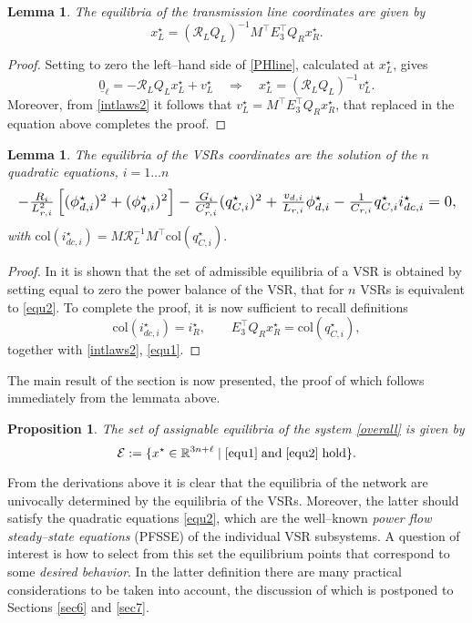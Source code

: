 \documentclass[5p,twocolumn]{elsarticle}
\def\begequ{\begin{equation}}
\def\endequ{\end{equation}}
\def\lab{\label}
\newtheorem{lemma}[theorem]{Lemma}
\newtheorem{proposition}[theorem]{Proposition}
\numberwithin{equation}{section}
\begin{document}
\begin{lemma}\em
\lab{lem1}
The equilibria of the transmission line coordinates are given by
\begequ
\lab{equ1}
x^\star _L=(\mathcal{R}_LQ_L)^{-1}M^\top E_3^\top Q_Rx_R^\star.
\endequ
\end{lemma}
\begin{proof}
Setting to zero the left--hand side of \eqref{PHline}, calculated at $x_L^\star $, gives
$$
\underline{0}_\ell=-\mathcal{R}_LQ_Lx^\star _L+v_L^\star \quad\Rightarrow\quad x^\star _L=(\mathcal{R}_LQ_L)^{-1}v_L^\star .
$$
Moreover, from \eqref{intlaws2} it follows that $v_L^\star =M^\top E_3^\top Q_Rx_R^\star $, that replaced in the equation above completes the proof.
\end{proof}

\begin{lemma}\em
\lab{lem2}
The equilibria of the VSRs coordinates are the solution of the $n$ quadratic equations, $i=1\dots n$
\begequ
\lab{equ2}\resizebox{1\hsize}{!}{$
-\frac{R_i}{L_{r,i}^2} \left[(\phi_{d,i}^\star)^2+(\phi_{q,i}^\star)^2\right]-\frac{G_i}{C_{r,i}^2}(q_{C,i}^\star)^2+\frac{v_{d,i}}{L_{r,i}}\phi_{d,i}^\star-\frac{1}{C_{r,i}}q^\star_{C,i}i_{dc,i}^\star=0,$}
\endequ
with $
\mathrm{col}(i^\star_{dc,i})=M\mathcal{R}_L^{-1}M^\top \mathrm{col}(q_{C,i}^\star).
$
\end{lemma}
\begin{proof}
In \cite{sanchez} it is shown that the set of admissible equilibria of a VSR is obtained by setting equal to zero the power balance of the VSR, that for $n$ VSRs is equivalent to \eqref{equ2}. To complete the proof, it is now sufficient to recall definitions $$\mathrm{col}(i^\star_{dc,i})=i_R^\star,\qquad E_3^\top Q_Rx_R^\star=\mathrm{col}(q_{C,i}^\star),$$ together with \eqref{intlaws2}, \eqref{equ1}.
\end{proof}
The main result of the section is now presented, the proof of which follows immediately from the lemmata above.
\begin{proposition}\em
\label{prop}
The set of assignable equilibria of the system \eqref{overall} is given by
\begequ
\mathcal{E}:=\{ x^\star  \in\mathbb{R}^{3n+\ell}\;\vert \; \eqref{equ1}\;\mbox{and}\; \eqref{equ2}\; \mbox{hold}\}.
\endequ

\end{proposition}

From the derivations above it is clear that the equilibria of the network are univocally determined by the equilibria of the VSRs. Moreover, the latter should satisfy the quadratic equations \eqref{equ2},
which are the well--known \textit{power flow steady--state equations} (PFSSE) of the individual VSR subsystems. A question of  interest is how to select from this set the equilibrium points that correspond to some {\em desired behavior}. In the latter definition there are many practical considerations to be taken into account, the discussion of which is postponed to Sections \ref{sec6} and \ref{sec7}.
\end{document}
